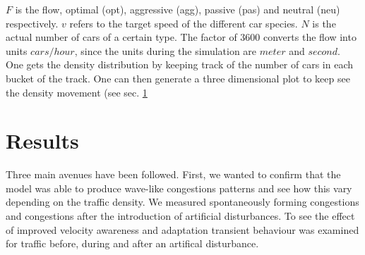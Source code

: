 \documentclass[11pt,a4paper,twocolumn]{article}
\begin{document}
$F$ is the flow, optimal (opt), aggressive (agg), passive (pas) and neutral (neu) respectively. $v$ refers to the target speed of the different car species. $N$ is the actual number of cars of a certain type. The factor of $3600$ converts the flow into units $cars/hour$, since the units during the simulation are $meter$ and $second$.\\
One gets the density distribution by keeping track of the number of cars in each bucket of the track. One can then generate a three dimensional plot to keep see the density movement (see sec. \ref{sec:results}



\section{Results}\label{sec:results}
Three main avenues have been followed. First, we wanted to confirm that the model was able to produce wave-like congestions patterns and see how this vary depending on the traffic density. We measured spontaneously forming congestions and congestions after the introduction of artificial disturbances. To see the effect of improved velocity awareness and adaptation transient behaviour was examined for traffic before, during and after an artifical disturbance. 




\end{document}
